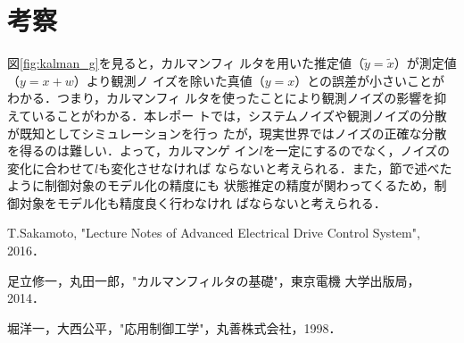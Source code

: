 \documentclass[a4paper,12pt]{jarticle}
\begin{document}
\section{考察}
図\ref{fig:kalman_g}を見ると，カルマンフィ
ルタを用いた推定値（$\tilde{y}=\tilde{x}$）が測定値（$y=x+w$）より観測ノ
イズを除いた真値（$y=x$）との誤差が小さいことがわかる．つまり，カルマンフィ
ルタを使ったことにより観測ノイズの影響を抑えていることがわかる．本レポー
トでは，システムノイズや観測ノイズの分散が既知としてシミュレーションを行っ
たが，現実世界ではノイズの正確な分散を得るのは難しい．よって，カルマンゲ
イン$l$を一定にするのでなく，ノイズの変化に合わせて$l$も変化させなければ
ならないと考えられる．また，節で述べたように制御対象のモデル化の精度にも
状態推定の精度が関わってくるため，制御対象をモデル化も精度良く行わなけれ
ばならないと考えられる．
%
\begin{thebibliography}{99}

  T.Sakamoto,
		 "Lecture Notes of Advanced Electrical Drive Control System",
		 2016．

  足立修一，丸田一郎，"カルマンフィルタの基礎"，東京電機
		 大学出版局，2014．

  堀洋一，大西公平，"応用制御工学"，丸善株式会社，1998．
\end{thebibliography}
\end{document}

